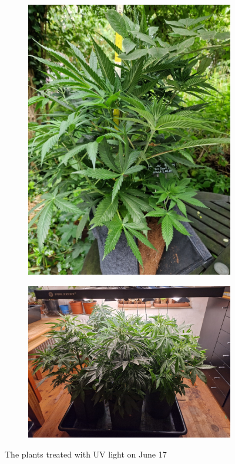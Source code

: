 \begin{figure}[H]
\begin{subfigure}[t]{.19\textwidth}
        \includegraphics[width=\linewidth]{plant_11_2024-06-17}
        \label{fig:plant_11_2024-06-17}
    \end{subfigure}
    \begin{subfigure}[t]{.3\textwidth}
        \includegraphics[width=\linewidth]{plant_uv_2024-06-17}
        \label{fig:plant_uv_2024-06-17}
    \end{subfigure}
    \caption[Plants of the UV group on June 17]{The plants treated with UV light on June 17}
    \label{fig:plants_uv_2024-06-17}
\end{figure}

